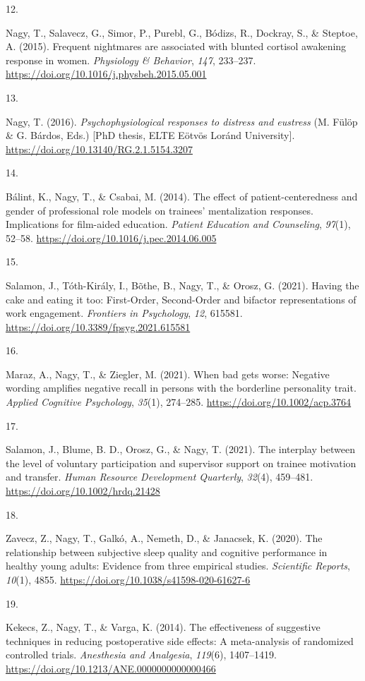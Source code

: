 \documentclass[10pt,a4paper,]{twentysecondcv}
\newlength{\csllabelwidth}
\newcommand{\CSLLeftMargin}[1]{\parbox[t]{\csllabelwidth}{#1}}
\newcommand{\CSLRightInline}[1]{\parbox[t]{\linewidth - \csllabelwidth}{#1}}
\begin{document}
\leavevmode{}%
\CSLLeftMargin{12. }%
\CSLRightInline{Nagy, T., Salavecz, G., Simor, P., Purebl, G., Bódizs,
R., Dockray, S., \& Steptoe, A. (2015). Frequent nightmares are
associated with blunted cortisol awakening response in women.
\emph{Physiology \& Behavior}, \emph{147}, 233--237.
\url{https://doi.org/10.1016/j.physbeh.2015.05.001}}

\leavevmode{}%
\CSLLeftMargin{13. }%
\CSLRightInline{Nagy, T. (2016). \emph{Psychophysiological responses to
distress and eustress} (M. Fülöp \& G. Bárdos, Eds.) {[}PhD thesis, ELTE
Eötvös Loránd University{]}.
\url{https://doi.org/10.13140/RG.2.1.5154.3207}}

\leavevmode{}%
\CSLLeftMargin{14. }%
\CSLRightInline{Bálint, K., Nagy, T., \& Csabai, M. (2014). The effect
of patient-centeredness and gender of professional role models on
trainees' mentalization responses. Implications for film-aided
education. \emph{Patient Education and Counseling}, \emph{97}(1),
52--58. \url{https://doi.org/10.1016/j.pec.2014.06.005}}

\leavevmode{}%
\CSLLeftMargin{15. }%
\CSLRightInline{Salamon, J., Tóth-Király, I., Bõthe, B., Nagy, T., \&
Orosz, G. (2021). Having the cake and eating it too: First-Order,
Second-Order and bifactor representations of work engagement.
\emph{Frontiers in Psychology}, \emph{12}, 615581.
\url{https://doi.org/10.3389/fpsyg.2021.615581}}

\leavevmode{}%
\CSLLeftMargin{16. }%
\CSLRightInline{Maraz, A., Nagy, T., \& Ziegler, M. (2021). When bad
gets worse: Negative wording amplifies negative recall in persons with
the borderline personality trait. \emph{Applied Cognitive Psychology},
\emph{35}(1), 274--285. \url{https://doi.org/10.1002/acp.3764}}

\leavevmode{}%
\CSLLeftMargin{17. }%
\CSLRightInline{Salamon, J., Blume, B. D., Orosz, G., \& Nagy, T.
(2021). The interplay between the level of voluntary participation and
supervisor support on trainee motivation and transfer. \emph{Human
Resource Development Quarterly}, \emph{32}(4), 459--481.
\url{https://doi.org/10.1002/hrdq.21428}}

\leavevmode{}%
\CSLLeftMargin{18. }%
\CSLRightInline{Zavecz, Z., Nagy, T., Galkó, A., Nemeth, D., \&
Janacsek, K. (2020). The relationship between subjective sleep quality
and cognitive performance in healthy young adults: Evidence from three
empirical studies. \emph{Scientific Reports}, \emph{10}(1), 4855.
\url{https://doi.org/10.1038/s41598-020-61627-6}}

\leavevmode{}%
\CSLLeftMargin{19. }%
\CSLRightInline{Kekecs, Z., Nagy, T., \& Varga, K. (2014). The
effectiveness of suggestive techniques in reducing postoperative side
effects: A meta-analysis of randomized controlled trials.
\emph{Anesthesia and Analgesia}, \emph{119}(6), 1407--1419.
\url{https://doi.org/10.1213/ANE.0000000000000466}}
\end{document}
